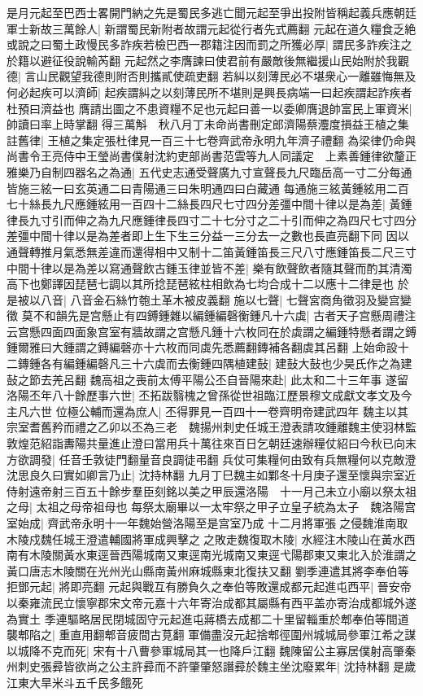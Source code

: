 是月元起至巴西士畧開門納之先是蜀民多逃亡聞元起至爭出投附皆稱起義兵應朝廷軍士新故三萬餘人|{
	新謂蜀民新附者故謂元起從行者先式薦翻}
元起在道久糧食乏絶或說之曰蜀土政慢民多詐疾若檢巴西一郡籍注因而罰之所獲必厚|{
	謂民多詐疾注之於籍以避征役說輸芮翻}
元起然之李膺諫曰使君前有嚴敵後無繼援山民始附於我觀德|{
	言山民觀望我德則附否則攜貳使疏吏翻}
若糾以刻薄民必不堪衆心一離雖悔無及何必起疾可以濟師|{
	起疾謂糾之以刻薄民所不堪則是興長病端一曰起疾謂起詐疾者杜預曰濟益也}
膺請出圖之不患資糧不足也元起曰善一以委卿膺退帥富民上軍資米|{
	帥讀曰率上時掌翻}
得三萬斛　秋八月丁未命尚書刪定郎濟陽蔡灋度損益王植之集註舊律|{
	王植之集定張杜律見一百三十七卷齊武帝永明九年濟子禮翻}
為梁律仍命與尚書令王亮侍中王瑩尚書僕射沈約吏部尚書范雲等九人同議定　上素善鍾律欲釐正雅樂乃自制四器名之為通|{
	五代史志通受聲廣九寸宣聲長九尺臨岳高一寸二分每通皆施三絃一曰玄英通二曰青陽通三曰朱明通四曰白藏通}
每通施三絃黃鍾絃用二百七十絲長九尺應鍾絃用一百四十二絲長四尺七寸四分差彊中間十律以是為差|{
	黃鍾律長九寸引而伸之為九尺應鍾律長四寸二十七分寸之二十引而伸之為四尺七寸四分差彊中間十律以是為差者即上生下生三分益一三分去一之數也長直亮翻下同}
因以通聲轉推月氣悉無差違而還得相中又制十二笛黃鍾笛長三尺八寸應鍾笛長二尺三寸中間十律以是為差以寫通聲飲古鍾玉律並皆不差|{
	樂有飲聲飲者隨其聲而酌其清濁高下也鄭譯因琵琶七調以其所捻琵琶絃柱相飲為七均合成十二以應十二律是也}
於是被以八音|{
	八音金石絲竹匏土革木被皮義翻}
施以七聲|{
	七聲宮商角徵羽及變宫變徵}
莫不和韻先是宫懸止有四鎛鍾雜以編鍾編磬衡鍾凡十六虡|{
	古者天子宫懸周禮注云宫懸四面四面象宫室有牆故謂之宫懸凡鍾十六枚同在於虡謂之編鍾特懸者謂之鎛鍾爾雅曰大鍾謂之鎛編磬亦十六枚而同虡先悉薦翻鏄補各翻虡其呂翻}
上始命設十二鏄鍾各有編鍾編磬凡三十六虡而去衡鍾四隅植建鼔|{
	建鼔大鼔也少昊氏作之為建鼔之節去羌呂翻}
魏高祖之喪前太傅平陽公丕自晉陽來赴|{
	此太和二十三年事}
遂留洛陽丕年八十餘歷事六世|{
	丕拓跋翳槐之曾孫從世祖臨江歷景穆文成獻文孝文及今主凡六世}
位極公輔而還為庶人|{
	丕得罪見一百四十一卷齊明帝建武四年}
魏主以其宗室耆舊矜而禮之乙卯以丕為三老　魏揚州刺史任城王澄表請攻鍾離魏主使羽林監敦煌范紹詣夀陽共量進止澄曰當用兵十萬往來百日乞朝廷速辦糧仗紹曰今秋已向末方欲調發|{
	任音壬敦徒門翻量音良調徒弔翻}
兵仗可集糧何由致有兵無糧何以克敵澄沈思良久曰實如卿言乃止|{
	沈持林翻}
九月丁巳魏主如鄴冬十月庚子還至懷與宗室近侍射遠帝射三百五十餘步羣臣刻銘以美之甲辰還洛陽　十一月己未立小廟以祭太祖之母|{
	太祖之母帝祖母也}
每祭太廟畢以一太牢祭之甲子立皇子統為太子　魏洛陽宫室始成|{
	齊武帝永明十一年魏始營洛陽至是宫室乃成}
十二月將軍張之侵魏淮南取木陵戍魏任城王澄遣輔國將軍成興擊之之敗走魏復取木陵|{
	水經注木陵山在黃水西南有木陵關黃水東逕晉西陽城南又東逕南光城南又東逕弋陽郡東又東北入於淮謂之黃口唐志木陵關在光州光山縣南黃州麻城縣東北復扶又翻}
劉季連遣其將李奉伯等拒鄧元起|{
	將即亮翻}
元起與戰互有勝負久之奉伯等敗還成都元起進屯西平|{
	晉安帝以秦雍流民立懷寧郡宋文帝元嘉十六年寄治成都其屬縣有西平盖亦寄治成都城外遂為實土}
季連驅略居民閉城固守元起進屯蔣橋去成都二十里留輜重於郫奉伯等間道襲郫陷之|{
	重直用翻郫音疲間古莧翻}
軍備盡沒元起捨郫徑圍州城城局參軍江希之謀以城降不克而死|{
	宋有十八曹參軍城局其一也降戶江翻}
魏陳留公主寡居僕射高肇秦州刺史張彛皆欲尚之公主許彛而不許肇肇怒譖彛於魏主坐沈廢累年|{
	沈持林翻}
是歲江東大旱米斗五千民多餓死

